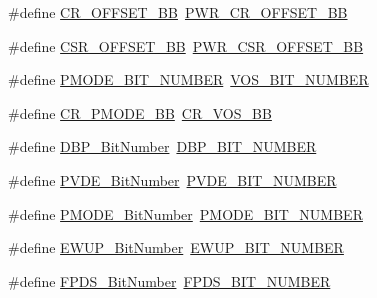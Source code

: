 \begin{DoxyCompactItemize}
\#define \hyperlink{group___h_a_l___p_w_r___aliased_ga8f5087b1948b370918ecbdf8eb614543}{C\+R\+\_\+\+O\+F\+F\+S\+E\+T\+\_\+\+BB}~\hyperlink{group___p_w_r__register__alias__address_ga387e4e883d6bea5c2223adc42ee72daa}{P\+W\+R\+\_\+\+C\+R\+\_\+\+O\+F\+F\+S\+E\+T\+\_\+\+BB}
\item 
\#define \hyperlink{group___h_a_l___p_w_r___aliased_gaed8fdacbc906bcba6acfa26ffbfc1305}{C\+S\+R\+\_\+\+O\+F\+F\+S\+E\+T\+\_\+\+BB}~\hyperlink{group___p_w_r__register__alias__address_gaa9477acfcacc4610533df164c94ad6fd}{P\+W\+R\+\_\+\+C\+S\+R\+\_\+\+O\+F\+F\+S\+E\+T\+\_\+\+BB}
\item 
\#define \hyperlink{group___h_a_l___p_w_r___aliased_gadcd5e2748a515ef914b84737e10ab061}{P\+M\+O\+D\+E\+\_\+\+B\+I\+T\+\_\+\+N\+U\+M\+B\+ER}~\hyperlink{group___p_w_r___c_r__register__alias_ga9fe65342711a2c4614ef2eadee4a751c}{V\+O\+S\+\_\+\+B\+I\+T\+\_\+\+N\+U\+M\+B\+ER}
\item 
\#define \hyperlink{group___h_a_l___p_w_r___aliased_ga2e7c040f5c63f0fce3e274d9a03f1d1a}{C\+R\+\_\+\+P\+M\+O\+D\+E\+\_\+\+BB}~\hyperlink{group___p_w_r___c_r__register__alias_ga98bf66513495732b9b3ee21f182e1591}{C\+R\+\_\+\+V\+O\+S\+\_\+\+BB}
\item 
\#define \hyperlink{group___h_a_l___p_w_r___aliased_ga36ff45d972bf94f31f172fd53cf44d23}{D\+B\+P\+\_\+\+Bit\+Number}~\hyperlink{group___p_w_r___c_r__register__alias_ga398aef263adbda7c1f1dc9020fde83f3}{D\+B\+P\+\_\+\+B\+I\+T\+\_\+\+N\+U\+M\+B\+ER}
\item 
\#define \hyperlink{group___h_a_l___p_w_r___aliased_ga17d618eb800c401ef9c6789c9374eaf8}{P\+V\+D\+E\+\_\+\+Bit\+Number}~\hyperlink{group___p_w_r___c_r__register__alias_gae731170c1675c5471fc06501228905b0}{P\+V\+D\+E\+\_\+\+B\+I\+T\+\_\+\+N\+U\+M\+B\+ER}
\item 
\#define \hyperlink{group___h_a_l___p_w_r___aliased_ga15fea9df1b0d324394336f70b319b377}{P\+M\+O\+D\+E\+\_\+\+Bit\+Number}~\hyperlink{group___h_a_l___p_w_r___aliased_gadcd5e2748a515ef914b84737e10ab061}{P\+M\+O\+D\+E\+\_\+\+B\+I\+T\+\_\+\+N\+U\+M\+B\+ER}
\item 
\#define \hyperlink{group___h_a_l___p_w_r___aliased_ga94fe0520e8f9b71fa2b99c0565ec70ea}{E\+W\+U\+P\+\_\+\+Bit\+Number}~\hyperlink{group___p_w_r___c_s_r__register__alias_gae006999c3cf61de12915df07eadb50f9}{E\+W\+U\+P\+\_\+\+B\+I\+T\+\_\+\+N\+U\+M\+B\+ER}
\item 
\#define \hyperlink{group___h_a_l___p_w_r___aliased_gad99a3da921e3e64587f6b9505ecba665}{F\+P\+D\+S\+\_\+\+Bit\+Number}~\hyperlink{group___p_w_r_ex__register__alias__address_gab04d9f278c4124285a9591c4f7098019}{F\+P\+D\+S\+\_\+\+B\+I\+T\+\_\+\+N\+U\+M\+B\+ER}

\end{DoxyCompactItemize}
